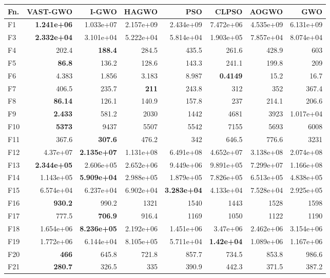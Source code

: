 \begin{tabular}{lrrrrrrr}
\toprule
Fn. & VAST-GWO & I-GWO & HAGWO & PSO & CLPSO & AOGWO & GWO\\
\midrule
F1 & \textbf{1.241e+06} & 1.033e+07 & 2.157e+09 & 2.434e+09 & 7.472e+06 & 4.535e+09 & 6.131e+09 \\
F3 & \textbf{2.332e+04} & 3.101e+04 & 5.222e+04 & 5.814e+04 & 1.903e+05 & 7.857e+04 & 8.074e+04 \\
F4 & 202.4 & \textbf{188.4} & 284.5 & 435.5 & 261.6 & 428.9 & 603 \\
F5 & \textbf{86.8} & 136.2 & 128.6 & 143.3 & 241.1 & 199.8 & 209 \\
F6 & 4.383 & 1.856 & 3.183 & 8.987 & \textbf{0.4149} & 15.2 & 16.7 \\
F7 & 406.5 & 235.7 & \textbf{211} & 243.8 & 312 & 352 & 367.4 \\
F8 & \textbf{86.14} & 126.1 & 140.9 & 157.8 & 237 & 214.1 & 206.6 \\
F9 & \textbf{2.433} & 581.2 & 2030 & 1442 & 4681 & 3923 & 1.017e+04 \\
F10 & \textbf{5373} & 9437 & 5507 & 5542 & 7155 & 5693 & 6008 \\
F11 & 367.6 & \textbf{307.6} & 476.2 & 342 & 646.5 & 776.6 & 3231 \\
F12 & 4.37e+07 & \textbf{2.135e+07} & 1.131e+08 & 6.491e+08 & 4.652e+07 & 3.138e+08 & 2.074e+08 \\
F13 & \textbf{2.344e+05} & 2.606e+05 & 2.652e+06 & 9.449e+06 & 9.891e+05 & 7.299e+07 & 1.166e+08 \\
F14 & 1.143e+05 & \textbf{5.909e+04} & 2.988e+05 & 1.879e+05 & 7.826e+05 & 6.513e+05 & 4.838e+05 \\
F15 & 6.574e+04 & 6.237e+04 & 6.902e+04 & \textbf{3.283e+04} & 4.133e+04 & 7.528e+04 & 2.925e+05 \\
F16 & \textbf{930.2} & 990.2 & 1321 & 1540 & 1443 & 1528 & 1598 \\
F17 & 777.5 & \textbf{706.9} & 916.4 & 1169 & 1050 & 1122 & 1190 \\
F18 & 1.654e+06 & \textbf{8.236e+05} & 2.192e+06 & 1.451e+06 & 3.47e+06 & 2.462e+06 & 3.154e+06 \\
F19 & 1.772e+06 & 6.144e+04 & 8.105e+05 & 5.711e+04 & \textbf{1.42e+04} & 1.089e+06 & 1.167e+06 \\
F20 & \textbf{466} & 645.8 & 721.8 & 857.7 & 734.5 & 853.8 & 986.6 \\
F21 & \textbf{280.7} & 326.5 & 335 & 390.9 & 442.3 & 371.5 & 387.2 \\

\end{tabular}
